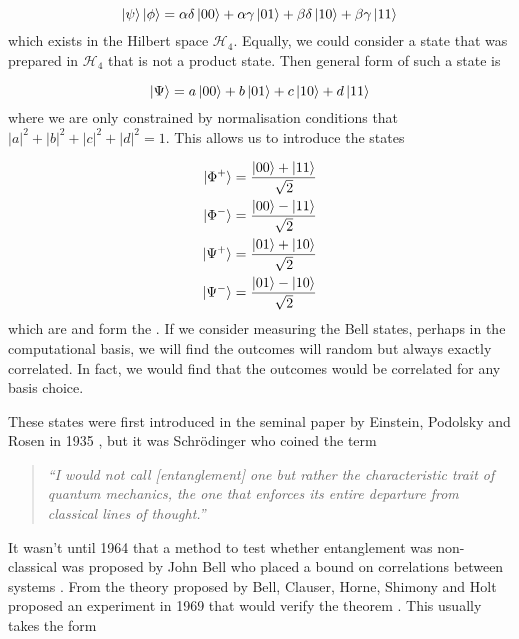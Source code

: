 \begin{equation}
	\ket{\psi}\ket{\phi} = \alpha\delta\ket{00} + \alpha\gamma\ket{01} + \beta\delta\ket{10} + \beta\gamma\ket{11}
\end{equation}
which exists in the Hilbert space $\mathcal{H}_4$. Equally, we could consider a state that was prepared in $\mathcal{H}_4$ that is not a product state. Then general form of such a state is

\begin{equation}
	\ket{\Psi} = a\ket{00} + b\ket{01} + c\ket{10} + d\ket{11}
\end{equation}
where we are only constrained by normalisation conditions that $|a|^2 + |b|^2 + |c|^2 + |d|^2 = 1$. This allows us to introduce the states

\begin{align}
	\label{eq:BellStateStart}
	\ket{\Phi^+} &= \frac{\ket{00} + \ket{11}}{\sqrt{2}}\\
	\ket{\Phi^-} &= \frac{\ket{00} - \ket{11}}{\sqrt{2}}\\
	\ket{\Psi^+} &= \frac{\ket{01} + \ket{10}}{\sqrt{2}}\\
	\ket{\Psi^-} &= \frac{\ket{01} - \ket{10}}{\sqrt{2}}
	\label{eq:BellStateEnd}
\end{align}
which are  and form the . If we consider measuring the Bell states, perhaps in the computational basis, we will find the outcomes will random but always exactly correlated. In fact, we would find that the outcomes would be correlated for any basis choice.

These states were first introduced in the seminal paper by Einstein, Podolsky and Rosen in 1935 \cite{einstein1935can}, but it was Schr\"{o}dinger who coined the term

\begin{quote}
\textit{``I would not call [entanglement] one but rather the characteristic trait of quantum mechanics, the one that enforces its entire departure from classical lines of thought.''}
\end{quote}

It wasn't until 1964 that a method to test whether entanglement was non-classical was proposed by John Bell who placed a bound on correlations between systems \cite{Bell1964Einstein}. From the theory proposed by Bell, Clauser, Horne, Shimony and Holt proposed an experiment in 1969 that would verify the theorem \cite{CHSH}. This usually takes the form

